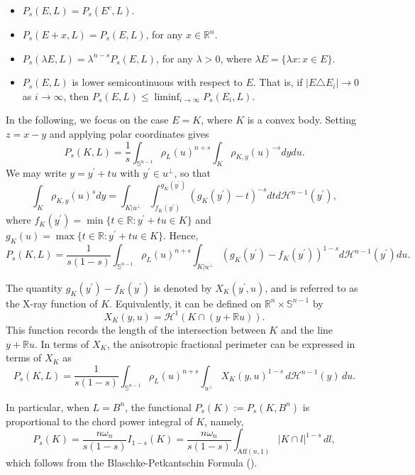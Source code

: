 \documentclass[12pt, oneside,reqno]{amsart}
\numberwithin{equation}{section}
\newtheorem{definition and theorem}[theorem]{Definition and Theorem}
\theoremstyle{plain}
\theoremstyle{remark}
\theoremstyle{definition}
\newcommand{\sn}{{\mathbb S}^{n-1}}
\newcommand{\tr}{\mathbb R}
\newcommand{\rn}{\mathbb R^n}
\newcommand{\tH}{\mathcal{H}}
\begin{document}
\begin{itemize}[itemsep=5pt, label=\scriptsize$\bullet$]
    \item $P_s(E,L)=P_s(E^c,L)$.
    
    \item $P_s(E+x,L)=P_s(E,L)$, for any $x\in\rn$.
    
    \item $P_s(\lambda E,L)=\lambda^{n-s}P_s(E,L)$, for any $\lambda>0$, where $\lambda E=\{\lambda x: x\in E\}$.
    
    \item $P_s(E,L)$ is lower semicontinuous with respect to $E$. That is, if $|E\triangle E_i|\rightarrow 0$ as $i\rightarrow \infty$, then $P_s(E,L)\leq \liminf_{i\rightarrow\infty} P_s(E_i,L)$.

\end{itemize}

In the following, we focus on the case $E = K$, where $K$ is a convex body. Setting $z=x-y$ and applying polar coordinates gives
\[P_s(K,L)=\frac{1}{s}\int_{\sn}\rho_L(u)^{n+s}\int_K\rho_{K,y}(u)^{-s}dydu.\]
We may write $y=y^{\prime}+tu$ with $y^{\prime}\in u ^{\perp}$, so that
\[\int_K\rho_{K,y}(u)^{s}dy=\int_{K|u^{\perp}}\int_{f_K(y^{\prime})}^{g_K(y^{\prime})}(g_K(y^{\prime})-t)^{-s}dtd\tH^{n-1}(y^{\prime}),\]
where $f_K(y^{\prime})=\min\{t\in\tr: y^{\prime}+tu\in K\}$ and $g_K(u)=\max\{t\in\tr: y^{\prime}+tu\in K\}$. Hence, 
\[P_s(K,L)=\frac{1}{s(1-s)}\int_{\sn}\rho_L(u)^{n+s}\int_{K|u^{\perp}}(g_K(y^{\prime})-f_K(y^{\prime}))^{1-s}d\tH^{n-1}(y^{\prime})du.\]

The quantity $g_K(y^{\prime})-f_K(y^{\prime})$ is denoted by $X_K(y^{\prime},u)$, and is referred to as the X-ray function of $K$. Equivalently, it can be defined on $\rn\times \sn$ by
\[X_K(y,u)=\tH^1(K\cap (y+\tr u)).\]
This function records the length of the intersection between $K$ and the line $y + \mathbb{R} u$. In terms of $X_K$, the anisotropic fractional perimeter can be expressed in terms of $X_K$ as
\begin{equation} \label{as-X}
P_s(K, L) = \frac{1}{s(1-s)} \int_{\sn} \rho_L(u)^{n+s} \int_{u^\perp} X_K(y, u)^{1-s} \, d\mathcal{H}^{n-1}(y) \, du.
\end{equation}

In particular, when $L = B^n$, the functional $P_s(K) := P_s(K, B^n)$ is proportional to the chord power integral of $K$, namely,
\begin{equation}\label{Ps-int}
    P_s(K) = \frac{n\omega_n}{s(1-s)} I_{1-s}(K) = \frac{n\omega_n}{s(1-s)} \int_{\mathrm{Aff}(n,1)} |K \cap l|^{1-s} \, dl,
\end{equation}
which follows from the Blaschke-Petkantschin Formula (\cite[Theorem 7.2.7]{SW}).
\end{document}
